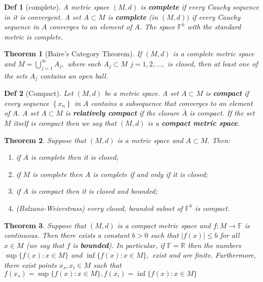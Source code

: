 \documentclass[10pt]{paper}
\newtheorem{theorem}{Theorem}[section]
\newtheorem{definition}{Def}[section]
\begin{document}
\begin{definition}[complete]
    A metric space $(M, d)$ is \textbf{complete} if every Cauchy sequence in it is convergent. A set $A \subset M$ is \textbf{complete} (in $(M, d))$ if every Cauchy sequence in $A$ converges to an element of $A$. The space $\mathbb{F}^{k}$ with the standard metric is complete.
\end{definition}

\begin{theorem}[Baire's Category Theorem]
    If $(M, d)$ is a complete metric space and $M=\bigcup_{j=1}^{\infty} A_{j},$ where each $A_{j} \subset M$ $j=1,2, \ldots,$ is closed, then at least one of the sets $A_{j}$ contains an open ball.
\end{theorem}

\begin{definition}[Compact]
    Let $(M, d)$ be a metric space. A set $A \subset M$ is \textbf{compact} if every sequence $\left\{x_{n}\right\}$ in $A$ contains a subsequence that converges to an element of $A .$ A set $A \subset M$ is \textbf{relatively compact} if the closure $\bar{A}$ is compact. If the set $M$ itself is compact then we say that $(M, d)$ is a \textbf{compact metric space}.
\end{definition}

\begin{theorem}
    Suppose that $(M, d)$ is a metric space and $A \subset M .$ Then:
    \begin{enumerate}
        \item if $A$ is complete then it is closed;
        \item if $M$ is complete then $A$ is complete if and only if it is closed;
        \item if $A$ is compact then it is closed and bounded;
        \item (Bolzano-Weierstrass) every closed, bounded subset of $\mathbb{F}^{k}$ is compact.
    \end{enumerate}
\end{theorem}

\begin{theorem}
    Suppose that $(M, d)$ is a compact metric space and $f: M \rightarrow \mathbb{F}$ is continuous. Then there exists a constant $b>0$ such that $|f(x)| \leq b$ for all $x \in M$ (we say that $f$ is \textbf{bounded}). In particular, if $\mathbb{F}=\mathbb{R}$ then the numbers $\sup \{f(x): x \in M\}$ and $\inf \{f(x): x \in M\},$ exist and are finite. Furthermore, there exist points $x_{s}, x_{i} \in M$ such that $f\left(x_{s}\right)=\sup \{f(x): x \in M\}, f\left(x_{i}\right)=\inf \{f(x): x \in M\}$
\end{theorem}
\end{document}
